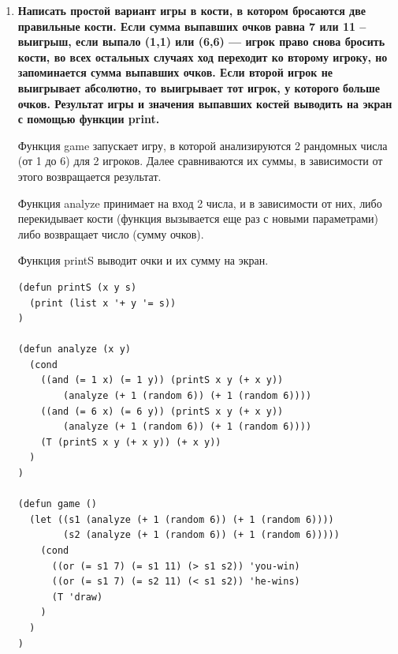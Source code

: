\documentclass[a4paper,14pt]{extreport} %
\begin{document}
\begin{enumerate}
\begin{lstlisting}
(defun centr (lst)
  (mapcar (lambda (x y) y) (cdr lst) lst)
)
\end{lstlisting}

Рекурсивно -- пока хвост не Nil, соединяем с помощью cons голову и возвращаем значение функции от хвоста:

\begin{lstlisting}
(defun centr (lst)
  (if (NULL (cadr lst)) () 
    (cons (car lst) (centr (cdr lst)))
  )
)
\end{lstlisting}

\item \textbf{Написать простой вариант игры в кости, в котором бросаются две правильные кости. Если сумма выпавших очков равна 7 или 11 -- выигрыш, если выпало (1,1) или (6,6) --- игрок право снова бросить кости, во всех остальных случаях ход переходит ко второму игроку, но запоминается сумма выпавших очков. Если второй игрок не выигрывает абсолютно, то выигрывает тот игрок, у которого больше очков. Результат игры и значения выпавших костей выводить на экран с помощью функции print.}

Функция game запускает игру, в которой анализируются 2 рандомных числа (от 1 до 6) для 2 игроков. Далее сравниваются их суммы, в зависимости от этого возвращается результат. 

Функция analyze принимает на вход 2 числа, и в зависимости от них, либо перекидывает кости (функция вызывается еще раз с новыми параметрами) либо возвращает число (сумму очков). 

Функция printS выводит очки и их сумму на экран. 

\begin{lstlisting}
(defun printS (x y s)
  (print (list x '+ y '= s))
)

(defun analyze (x y)
  (cond 
    ((and (= 1 x) (= 1 y)) (printS x y (+ x y)) 
        (analyze (+ 1 (random 6)) (+ 1 (random 6))))
    ((and (= 6 x) (= 6 y)) (printS x y (+ x y))
        (analyze (+ 1 (random 6)) (+ 1 (random 6))))
    (T (printS x y (+ x y)) (+ x y))
  ) 
)

(defun game ()
  (let ((s1 (analyze (+ 1 (random 6)) (+ 1 (random 6))))
        (s2 (analyze (+ 1 (random 6)) (+ 1 (random 6)))))
    (cond 
      ((or (= s1 7) (= s1 11) (> s1 s2)) 'you-win)
      ((or (= s1 7) (= s2 11) (< s1 s2)) 'he-wins)
      (T 'draw)
    )
  )
)
\end{lstlisting}

\hfill


\end{enumerate}
\end{document}
